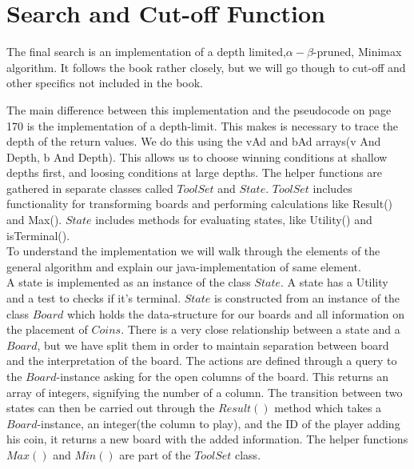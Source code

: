 \documentclass[11pt, a4paper]{article}
\begin{document}
\section*{Search and Cut-off Function}

The final search is an implementation of a depth limited,$\alpha-\beta$-pruned, Minimax algorithm. It follows the book rather closely, but we will go though to cut-off and other specifics not included in the book.

%

The main difference between this implementation and the pseudocode on page 170 is the implementation of a depth-limit. This makes is necessary to trace the depth of the return values. We do this using the vAd and bAd arrays(v And Depth, b And Depth). This allows us to choose winning conditions at shallow depths first, and loosing conditions at large depths. The helper functions are gathered in separate classes called $ToolSet$ and $State$. $ToolSet$ includes functionality for transforming boards and performing calculations like Result() and Max(). $State$ includes methods for evaluating states, like Utility() and isTerminal().\\

To understand the implementation we will walk through the elements of the general algorithm and explain our java-implementation of same element.\\

A state is implemented as an instance of the class $State$. A state has a Utility and a test to checks if it's terminal. $State$ is constructed from an instance of the class $Board$ which holds the data-structure for our boards and all information on the placement of $Coins$. There is a very close relationship between a state and a $Board$, but we have split them in order to maintain separation between board and the interpretation of the board. The actions are defined through a query to the $Board$-instance asking for the open columns of the board. This returns an array of integers, signifying the number of a column. The transition between two states can then be carried out through the $Result()$ method which takes a $Board$-instance, an integer(the column to play), and the ID of the player adding his coin, it returns a new board with the added information. The helper functions $Max()$ and $Min()$ are part of the $ToolSet$ class.
\end{document}
